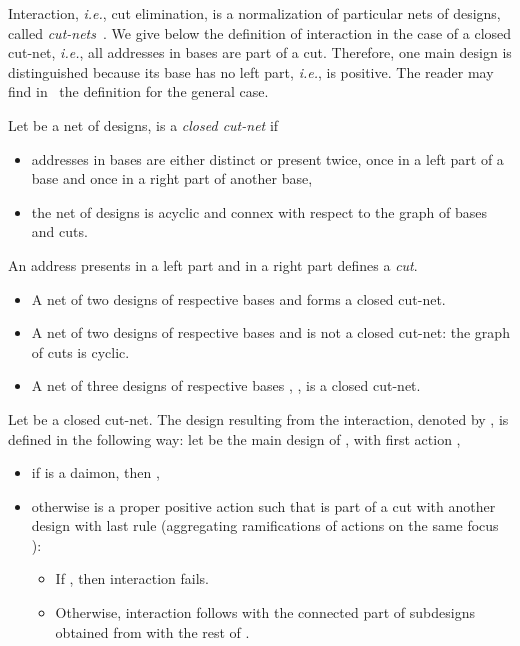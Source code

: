 \documentclass{LMCS}
\def\ie{{\em i.e.}}
\begin{document}
Interaction, \ie, cut elimination, is a normalization of particular nets of designs, called {\it cut-nets}~\cite{DBLP:journals/mscs/Girard01}. We give below the definition of interaction in the case of a closed cut-net, \ie, all addresses in bases are part of a cut. Therefore, one main design is distinguished because its base has no left part, \ie, is positive. 
The reader may find in~\cite{DBLP:journals/mscs/Girard01} the definition for the general case.

 
\begin{defi}
Let  be a net of designs,  is a {\em closed cut-net} if 
\begin{itemize}
\item addresses in bases are either distinct or present twice, once in a left part of a base and once in a right part of another base,
\item the net of designs is acyclic and connex with respect to the graph of bases and cuts.
\end{itemize}
An address presents in a left part and in a right part defines a {\em cut}. 
\end{defi}

\begin{exa}\hfill
\begin{itemize}
\item A net of two designs of respective bases  and  forms a closed cut-net.
\item A net of two designs of respective bases  and  is not a closed cut-net: the graph of cuts is cyclic.
\item A net of three designs of respective bases , ,  is a closed cut-net.
\end{itemize}
\end{exa}
 
\begin{defi}
Let  be a closed cut-net. 
The design resulting from the interaction, denoted by , is defined in the following way:
let  be the main design of , with first action ,
\begin{itemize}
\item if  is a daimon, then ,
\item otherwise  is a proper positive action  such that  is part of a cut with another design with last rule  (aggregating ramifications of actions on the same focus ):
	\begin{itemize}
	\item If , then interaction fails.
	\item Otherwise, interaction follows with the connected part of subdesigns obtained from  with the rest of .
	\end{itemize}
\end{itemize}
\end{defi}
\end{document}
